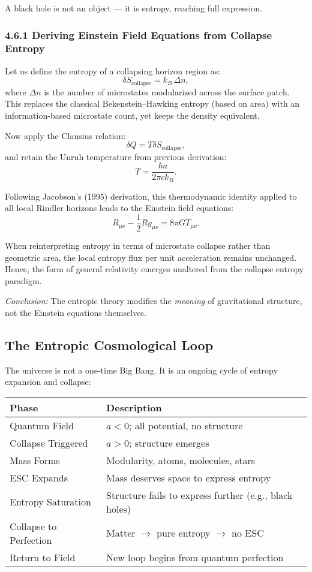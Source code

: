\documentclass[12pt]{article}
\begin{document}
\noindent
A black hole is not an object — it is entropy, reaching full expression.

\subsubsection*{4.6.1 Deriving Einstein Field Equations from Collapse Entropy}

Let us define the entropy of a collapsing horizon region as:
\[
\delta S_{\text{collapse}} = k_B\, \Delta n,
\]
where \( \Delta n \) is the number of microstates modularized across the surface patch. This replaces the classical Bekenstein–Hawking entropy (based on area) with an information-based microstate count, yet keeps the density equivalent.

Now apply the Clausius relation:
\[
\delta Q = T \delta S_{\text{collapse}},
\]
and retain the Unruh temperature from previous derivation:
\[
T = \frac{\hbar a}{2\pi c k_B}.
\]

Following Jacobson’s (1995) derivation, this thermodynamic identity applied to all local Rindler horizons leads to the Einstein field equations:
\[
R_{\mu\nu} - \frac{1}{2} R g_{\mu\nu} = 8\pi G T_{\mu\nu}.
\]

When reinterpreting entropy in terms of microstate collapse rather than geometric area, the local entropy flux per unit acceleration remains unchanged. Hence, the form of general relativity emerges unaltered from the collapse entropy paradigm.

\textit{Conclusion:} The entropic theory modifies the \textit{meaning} of gravitational structure, not the Einstein equations themselves.

\subsection{The Entropic Cosmological Loop}

The universe is not a one-time Big Bang. It is an ongoing cycle of entropy expansion and collapse:

\vspace{1em}
\begin{center}
\begin{tabular}{|l|p{10.5cm}|}
\hline
\textbf{Phase} & \textbf{Description} \\
\hline
Quantum Field & $a < 0$; all potential, no structure \\
\hline
Collapse Triggered & $a > 0$; structure emerges \\
\hline
Mass Forms & Modularity, atoms, molecules, stars \\
\hline
ESC Expands & Mass deserves space to express entropy \\
\hline
Entropy Saturation & Structure fails to express further (e.g., black holes) \\
\hline
Collapse to Perfection & Matter $\rightarrow$ pure entropy $\rightarrow$ no ESC \\
\hline
Return to Field & New loop begins from quantum perfection \\
\hline
\end{tabular}
\end{center}
\vspace{1em}
\end{document}
